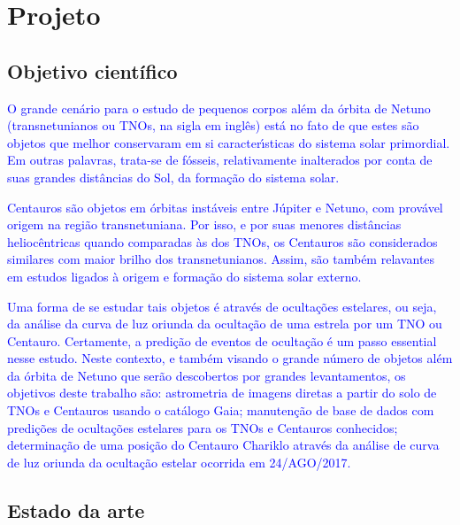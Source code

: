 \documentclass[a4paper, 11pt]{article}
\begin{document}
\renewcommand{\figurename}{\textsc{Figura}}
\renewcommand{\tablename}{\textsc{Tabela}}
\renewcommand{\refname}{Refer\^encias}




\section{Projeto}

\subsection{Objetivo científico}

\textcolor{blue}{O grande cen\'ario para o estudo de pequenos corpos al\'em da \'orbita de Netuno (transnetunianos ou TNOs, na sigla em ingl\^es) est\'a no fato de que estes s\~ao objetos que melhor conservaram em si caracter\'{\i}sticas do sistema solar primordial. Em outras palavras, trata-se de f\'osseis, relativamente inalterados por conta de suas grandes dist\^ancias do Sol, da forma\c c\~ao do sistema solar.}

\textcolor{blue}{Centauros s\~ao objetos em \'orbitas inst\'aveis entre J\'upiter e Netuno, com prov\'avel origem na regi\~ao transnetuniana. Por isso, e por suas menores dist\^ancias helioc\^entricas quando comparadas \`as dos TNOs, os Centauros s\~ao considerados similares com maior brilho dos transnetunianos. Assim, s\~ao tamb\'em relavantes em estudos ligados \`a origem e forma\c c\~ao do sistema solar externo.}

\textcolor{blue}{Uma forma de se estudar tais objetos \'e atrav\'es de oculta\c c\~oes estelares, ou seja, da an\'alise da curva de luz oriunda da oculta\c c\~ao de uma estrela por um TNO ou Centauro. Certamente, a predi\c c\~ao de eventos de oculta\c c\~ao \'e um passo essential nesse estudo. Neste contexto, e tamb\'em visando o grande n\'umero de objetos al\'em da \'orbita de Netuno que ser\~ao descobertos por grandes levantamentos, os objetivos deste trabalho s\~ao: astrometria de imagens diretas a partir do solo de TNOs e Centauros usando o cat\'alogo Gaia; manuten\c c\~ao de base de dados com predi\c c\~oes de oculta\c c\~oes estelares para os TNOs e Centauros conhecidos; determina\c c\~ao de uma posi\c c\~ao do Centauro Chariklo atrav\'es da an\'alise de curva de luz oriunda da  oculta\c c\~ao estelar ocorrida em 24/AGO/2017.}

\subsection{Estado da arte}
\end{document}
